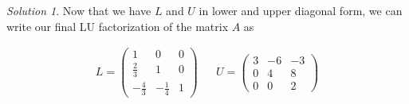 \documentclass[12pt,a4paper]{article}
\theoremstyle{definition}
\theoremstyle{remark}
\newtheorem*{solution}{Solution}
\begin{document}
\begin{solution}
    Now that we have $L$ and $U$ in lower and upper diagonal form, we can write our final LU factorization of the matrix $A$ as 

    \begin{align*}
        L = \begin{pmatrix}
            1 & 0 & 0 \\
            \frac{2}{3} & 1 & 0 \\
            -\frac{4}{3} & -\frac{1}{4} & 1
        \end{pmatrix} &&
        U = \begin{pmatrix}
            3 & -6 & -3 \\
            0 & 4 & 8 \\
            0 & 0 & 2
        \end{pmatrix}
    \end{align*}
\end{solution}
\end{document}

